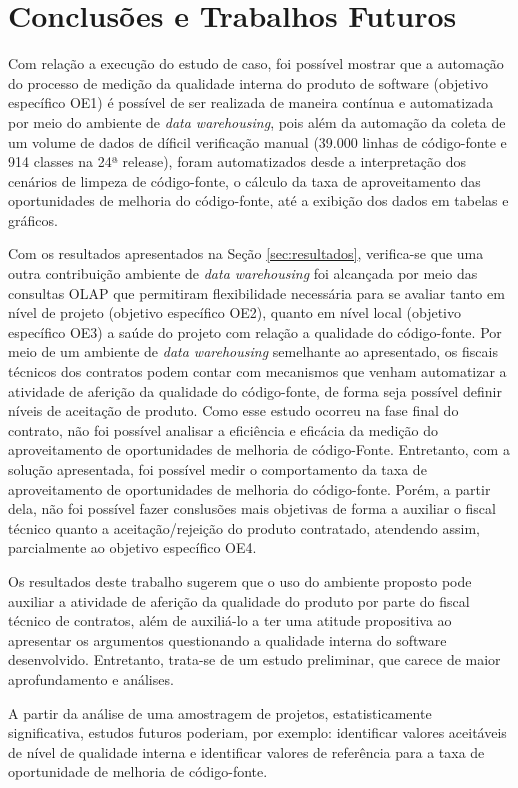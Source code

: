 \section{Conclusões e Trabalhos Futuros}


Com relação a execução do estudo de caso, foi possível mostrar que a automação do processo de medição da qualidade interna do produto de software (objetivo específico OE1)  é possível de ser realizada de maneira contínua e automatizada por meio do ambiente de \textit{data warehousing}, pois além da automação da coleta de um volume de dados de díficil verificação manual (39.000 linhas de código-fonte e 914 classes na 24ª release), foram automatizados desde a interpretação dos cenários de limpeza de código-fonte, o cálculo da taxa de aproveitamento das oportunidades de melhoria do código-fonte, até a exibição dos dados em tabelas e gráficos.

Com os resultados apresentados na Seção \ref{sec:resultados}, verifica-se que uma outra contribuição ambiente de \textit{data warehousing} foi alcançada por meio das consultas OLAP que permitiram flexibilidade necessária para se avaliar tanto em nível de projeto (objetivo específico OE2), quanto em nível local (objetivo específico OE3) a saúde do projeto com relação a qualidade do código-fonte. Por meio de um ambiente de \textit{data warehousing} semelhante ao apresentado, os fiscais técnicos dos contratos podem contar com mecanismos que venham automatizar a atividade de aferição da qualidade do código-fonte, de forma seja possível definir níveis de aceitação de produto.
Como esse estudo ocorreu na fase final do contrato, não foi possível analisar a eficiência e eficácia da medição do aproveitamento de oportunidades de melhoria de código-Fonte. Entretanto, com a solução apresentada, foi possível medir o comportamento da taxa de aproveitamento de oportunidades de melhoria do código-fonte. Porém, a partir dela, não foi possível fazer conslusões mais objetivas de forma a auxiliar o fiscal técnico quanto a aceitação/rejeição do produto contratado, atendendo assim, parcialmente ao objetivo específico OE4.

Os resultados deste trabalho sugerem que o uso do ambiente proposto pode auxiliar a atividade de aferição da qualidade do produto por parte do fiscal técnico de contratos, além de auxiliá-lo a ter uma atitude propositiva ao apresentar os argumentos questionando a qualidade interna do software desenvolvido. Entretanto, trata-se de um estudo preliminar, que carece de maior aprofundamento e análises.

A partir da análise de uma amostragem de projetos, estatisticamente significativa, estudos futuros poderiam, por exemplo: identificar valores aceitáveis de nível de qualidade interna e identificar valores de referência para a taxa de oportunidade de melhoria de código-fonte.